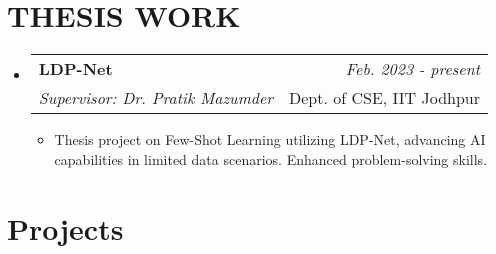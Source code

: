 \documentclass[a4paper,11pt]{article}
\makeatletter
\newcommand{\resumeSubheading}[4]{
\vspace{0.5mm}\item
    \begin{tabular*}{0.98\textwidth}[t]{l@{\extracolsep{\fill}}r}
        \textbf{#1} & \textit{\footnotesize{#4}} \\
        \textit{\footnotesize{#3}} &  \footnotesize{#2}\\
    \end{tabular*}
    \vspace{-2.4mm}
}
\newcommand{\resumeSubHeadingListStart}{\begin{itemize}[leftmargin=*,labelsep=0mm]}
\newcommand{\resumeItemListStart}{\begin{justify}\begin{itemize}[leftmargin=3ex, rightmargin=2ex, noitemsep,labelsep=1.2mm,itemsep=0mm]\small}
\newcommand{\resumeSubHeadingListEnd}{\end{itemize}\vspace{2mm}}
\newcommand{\resumeItemListEnd}{\end{itemize}\end{justify}\vspace{-2mm}}
\makeatother
\begin{document}





\section{THESIS WORK}
\resumeSubHeadingListStart

\resumeSubheading
  {LDP-Net}{Dept. of CSE, IIT Jodhpur}
  {Supervisor: Dr. Pratik Mazumder}{Feb. 2023 - present}
  \resumeItemListStart
  \item {Thesis project on Few-Shot Learning utilizing LDP-Net, advancing AI capabilities in limited data scenarios. Enhanced problem-solving skills.}
  \resumeItemListEnd


    
      
  \resumeSubHeadingListEnd
\vspace{-5.5mm}



\section{Projects}
\end{document}
